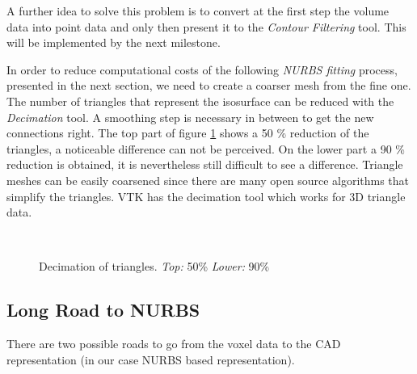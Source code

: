 A further idea to solve this problem is to convert at the first step the volume data into point data
and only then present it to the \textit{Contour Filtering} tool. This will be implemented by the next
milestone.

In order to reduce computational costs of the following \textit{NURBS fitting} process, presented in the next section, we need to create a coarser mesh from the fine one. The number of triangles that represent the
isosurface can be reduced with the \textit{Decimation} tool. A smoothing step is necessary in between
to get the new connections right. The top part of figure \ref{fig:Decimation} shows a 50 \% reduction of the
triangles, a noticeable difference can not be perceived. On the lower part a 90 \% reduction is
obtained, it is nevertheless still difficult to see a difference. Triangle meshes can be easily
coarsened since there are many open source algorithms that simplify the triangles. VTK has the
decimation tool which works for 3D triangle data.

\begin{figure}
\centering
   \\
   \caption{Decimation of triangles. \textit{Top:} 50\% \textit{Lower:} 90\%}
   \label{fig:Decimation}
\end{figure}

\subsection{Long Road to NURBS}
There are two possible roads to go from the voxel data to the CAD representation (in our case NURBS based representation).
